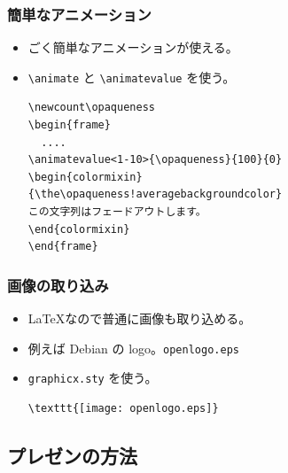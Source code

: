 \documentclass[mingoth,a4paper]{jsarticle}
\begin{document}
\subsubsection{簡単なアニメーション}


\begin{itemize}
\item ごく簡単なアニメーションが使える。
\item \verb|\animate| と \verb|\animatevalue| を使う。
  \begin{screen}
\begin{verbatim}
\newcount\opaqueness
\begin{frame}
  ....
\animatevalue<1-10>{\opaqueness}{100}{0}
\begin{colormixin}
{\the\opaqueness!averagebackgroundcolor}
この文字列はフェードアウトします。
\end{colormixin}
\end{frame}
\end{verbatim}
  \end{screen}
\end{itemize}


\subsubsection{画像の取り込み}

\begin{itemize}
\item \LaTeX{}なので普通に画像も取り込める。
\item 例えば Debian の logo。\texttt{openlogo.eps}
\item \texttt{graphicx.sty} を使う。
  \begin{screen}
\begin{verbatim}
\texttt{[image: openlogo.eps]}
\end{verbatim}
  \end{screen}
\end{itemize}

\subsection{プレゼンの方法}
\end{document}
